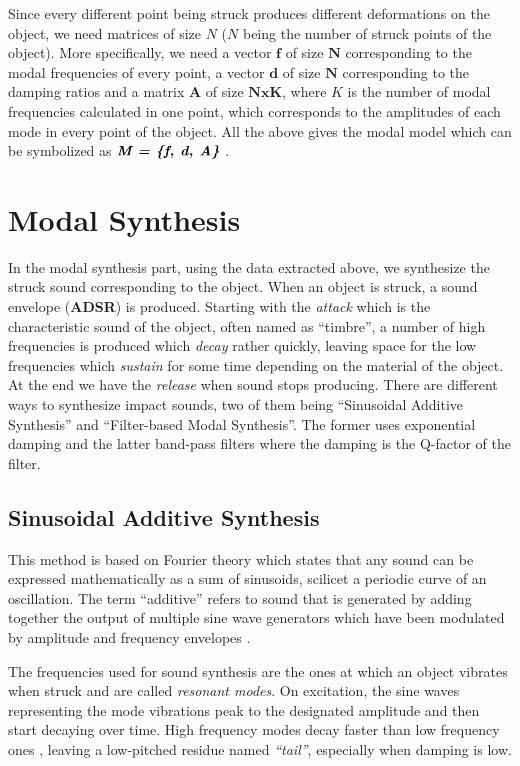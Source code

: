 Since every different point being struck produces different deformations on the object, we need matrices of size $N$ ($N$ being the number of struck points of the object). More specifically, we need a vector $\textbf{f}$ of size $\textbf{N}$ corresponding to the modal frequencies of every point, a vector $\textbf{d}$ of size $\textbf{N}$ corresponding to the damping ratios and a matrix $\textbf{A}$ of size $\textbf{NxK}$, where $K$ is the number of modal frequencies calculated in one point, which corresponds to the amplitudes of each mode in every point of the object. All the above gives the modal model which can be symbolized as $\textbf{\textit{M = \{f, d, A\}}}$ \cite{van2001foleyautomatic}.
 
\section{Modal Synthesis}\label{sec:modal_synth}
In the modal synthesis part, using the data extracted above, we synthesize the struck sound corresponding to the object. When an object is struck, a sound envelope (\textbf{ADSR}) is produced. Starting with the \textit{attack} which is the characteristic sound of the object, often named as ``timbre'', a number of high frequencies is produced which \textit{decay} rather quickly, leaving space for the low frequencies which \textit{sustain} for some time depending on the material of the object. At the end we have the \textit{release} when sound stops producing. There are different ways to synthesize impact sounds, two of them being ``Sinusoidal Additive Synthesis'' and ``Filter-based Modal Synthesis''. The former uses exponential damping and the latter band-pass filters where the damping is the Q-factor of the filter. 

\subsection{Sinusoidal Additive Synthesis}\label{sec:sin_synth}

This method is based on Fourier theory which states that any sound can be expressed mathematically as a sum of sinusoids, scilicet a periodic curve of an oscillation. The term ``additive'' refers to sound that is generated by adding together the output of multiple sine wave generators which have been modulated by amplitude and frequency envelopes \cite{smith2011spectral}.

The frequencies used for sound synthesis are the ones at which an object vibrates when struck and are called \textit{resonant modes}. On excitation, the sine waves representing the mode vibrations peak to the designated amplitude and then start decaying over time. High frequency modes decay faster than low frequency ones \cite{lloyd2011sound}, leaving a low-pitched residue named \textit{``tail''}, especially when damping is low.

